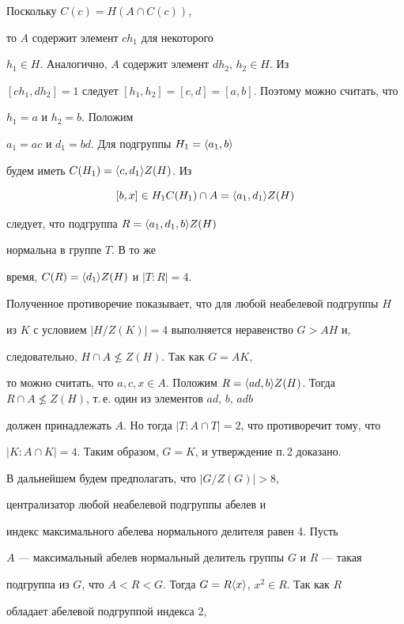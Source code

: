 Поскольку $C(c)=H(A\cap C(c))$,


то $A$ содержит элемент $ch_1$ для некоторого


$h_1\in H$. Аналогично, $A$ содержит элемент $dh_2$, $h_2\in H$. Из


$[ch_1,dh_2]=1$ следует $[h_1,h_2]=[c,d]=[a,b]$. Поэтому можно считать, что


$h_1=a$ и $h_2=b$. Положим


$a_1=ac$ и $d_1=bd$. Для подгруппы $H_1=\langle a_1,b\rangle$


будем иметь $C(H_1)=\langle c,d_1\rangle Z(H)$. Из


$$


[b,x]\in H_1C(H_1)\cap A=\ls a_1,d_1\ps Z(H)


$$


следует, что подгруппа $R=\langle a_1,d_1,b\rangle Z(H)$ 


нормальна в группе $T$. В то же


время, $C(R)=\langle d_1\rangle Z(H)$ и $|T:R|=4$.





Полученное противоречие показывает, что для любой неабелевой подгруппы $H$


из $K$ с условием $|H/Z(K)|=4$ выполняется неравенство $G>AH$ и, 


следовательно, $H\cap A\not\le Z(H)$. Так как $G=AK$, 


то можно считать, что $a,c,x\in A$. Положим $R=\ls ad,b\ps


Z(H)$. Тогда $R\cap A\not\le Z(H)$, т.\,е. один из элементов $ad$, $b$, $adb$


должен принадлежать $A$. Но тогда $|T:A\cap T|=2$, что противоречит тому, что


$|K:A\cap K|=4$. Таким образом, $G=K$, и утверждение п.\,2 доказано.





В дальнейшем будем предполагать, что $|G/Z(G)|>8$, 


централизатор любой неабелевой подгруппы абелев и 


индекс максимального абелева нормального делителя равен 4. Пусть


$A$ --- максимальный абелев нормальный делитель группы $G$ и $R$ --- такая


подгруппа из $G$, что $A<R<G$. Тогда $G=R\langle x\rangle$, $x^2\in R$. Так как $R$


обладает абелевой подгруппой индекса 2, 



